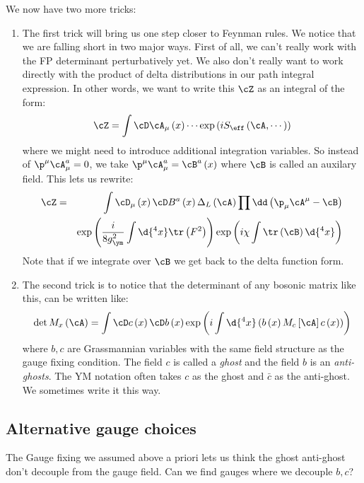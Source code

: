 \documentclass{booc}
\begin{document}
We now have two more tricks:
\begin{enumerate}
\item The first trick will bring us one step closer to Feynman rules. 
We notice that we are falling short in two major ways.
First of all, we can't really work with the FP determinant perturbatively yet.
We also don't really want to work directly with the product of delta distributions 
in our path integral expression. In other words, 
we want to write this $\cZ$ as an integral of the form:
\begin{equation}
\cZ = \int \cD \cA_\mu\left( x \right) \cdots
\exp\left( i S_{\eff} \left( \cA , \cdots \right) \right)
\end{equation}
where we might need to introduce additional integration variables.
So instead of $\p^\mu \cA_\mu^a = 0$, we take
$\p^\mu \cA_\mu^a = \cB^a \left( x \right)$
where $\cB$ is called an auxilary field.
This lets us rewrite:
\begin{eqnarray}
\cZ &=&  \int \cD_\mu\left( x \right) \cD B^a\left( x \right)
\Delta_L\left( \cA \right)
\prod \dd\left( \p_\mu \cA^\mu  - \cB \right)\\ 
&& \exp\left( \frac{i}{8 g_\ym^2}\int \d{^4x} \tr\left( F^2 \right) \right)
\exp\left( i\chi \int \tr\left( \cB \right) \d{^4 x} \right)
\end{eqnarray}
Note that if we integrate over $\cB$ we get back to the delta function form. 

\item The second trick is to notice that the determinant of any bosonic matrix like this, 
can be written like:
\begin{equation}
\det M_x\left( \cA \right) = \int \cD c\left( x \right) \cD b\left( x \right)
\exp\left( i \int \d{^4 x} \left( b\left( x \right) M_c\left[ \cA \right] 
c\left( x \right) \right) \right)
\end{equation}
where $b,c$ are Grassmannian variables with the same field structure as the gauge fixing condition.
The field $c$ is called a \emph{ghost} and the field $b$ is an \emph{anti-ghosts}.
The YM notation often takes $c$ as the ghost
and $\bar c$ as the anti-ghost.
We sometimes write it this way.
\end{enumerate}

\subsection{Alternative gauge choices}

The Gauge fixing we assumed above a priori lets us think
the ghost anti-ghost don't decouple from
the gauge field. 
Can we find gauges where we decouple $b,c$?
\end{document}
